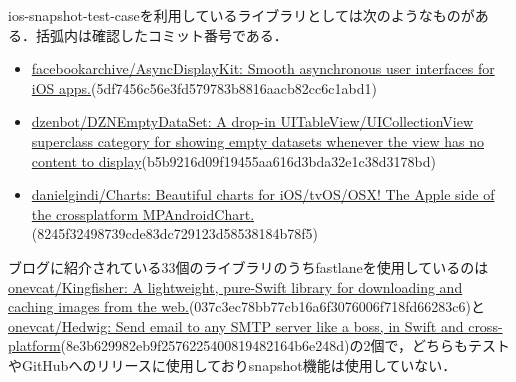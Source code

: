 ios-snapshot-test-caseを利用しているライブラリとしては次のようなものがある．括弧内は確認したコミット番号である．

\begin{itemize}
    \item \href{https://github.com/facebookarchive/AsyncDisplayKit}{facebookarchive/AsyncDisplayKit: Smooth asynchronous user interfaces for iOS apps.}(5df7456c56e3fd579783b8816aacb82cc6c1abd1)
    \item \href{https://github.com/dzenbot/DZNEmptyDataSet}{dzenbot/DZNEmptyDataSet: A drop-in UITableView/UICollectionView superclass category for showing empty datasets whenever the view has no content to display}(b5b9216d09f19455aa616d3bda32e1c38d3178bd)
    \item \href{https://github.com/danielgindi/Charts}{danielgindi/Charts: Beautiful charts for iOS/tvOS/OSX! The Apple side of the crossplatform MPAndroidChart.}(8245f32498739cde83dc729123d58538184b78f5)
\end{itemize}

ブログに紹介されている33個のライブラリのうちfastlaneを使用しているのは\href{https://github.com/onevcat/Kingfisher}{onevcat/Kingfisher: A lightweight, pure-Swift library for downloading and caching images from the web.}(037c3ec78bb77cb16a6f3076006f718fd66283c6)と\href{https://github.com/onevcat/Hedwig}{onevcat/Hedwig: Send email to any SMTP server like a boss, in Swift and cross-platform}(8e3b629982eb9f2576225400819482164b6e248d)の2個で，どちらもテストやGitHubへのリリースに使用しておりsnapshot機能は使用していない．
